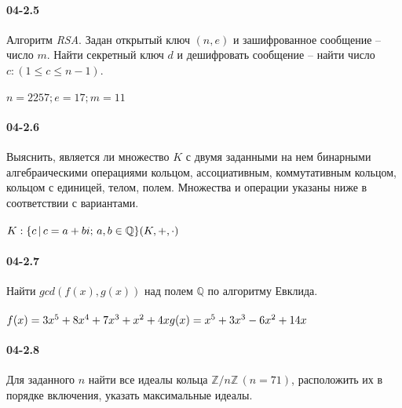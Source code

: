 \documentclass[12pt]{article}
\begin{document}
	\paragraph{04-2.5} Алгоритм \emph{RSA}. Задан открытый ключ $(n, e)$ и зашифрованное сообщение – число $m$. Найти секретный ключ $d$ и дешифровать сообщение – найти число $c : ( 1 \leq c \leq n - 1 )$.
	\\ \\
	\ensuremath{ n = 2257; e = 17; m = 11 }
	\clearpage
	\paragraph{04-2.6} Выяснить, является ли множество $K$ с двумя заданными на нем бинарными алгебраическими операциями кольцом, ассоциативным, коммутативным кольцом, кольцом с единицей, телом, полем. Множества и операции указаны ниже в соответствии с вариантами.
	\\ \\
	\ensuremath{
		K : \{ c \, | \, c = a + bi; \, a,b \in \mathbb{Q} \} \\
		(K, +, \cdot)
	}
	\clearpage
	\paragraph{04-2.7} Найти $gcd(f(x), g(x))$ над полем $\mathbb{Q}$ по алгоритму Евклида.
	\\ \\
	\ensuremath{
		f(x) = 3 x^5 + 8 x^4 + 7 x^3 + x^2 + 4 x \\
		g(x) = x^5 + 3 x^3 - 6 x^2 + 14x \\
	}
	\clearpage
	\paragraph{04-2.8} Для заданного $n$ найти все идеалы кольца $\mathbb{Z}/n\mathbb{Z} \, (n = 71)$, расположить их в порядке включения, указать максимальные идеалы. 
	\\ \\
	\ensuremath{}
	\clearpage
\end{document}

